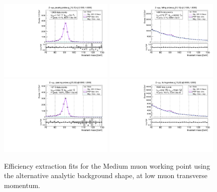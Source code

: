 \begin{figure}
\centering
\includegraphics[width=0.49\textwidth]{figures/Zmm_RecoTemplate_BkgAnalytic_pass_ptBin0_etaBin1.pdf}
\includegraphics[width=0.49\textwidth]{figures/Zmm_RecoTemplate_BkgAnalytic_fail_ptBin0_etaBin1.pdf}
\includegraphics[width=0.49\textwidth]{figures/Zmm_RecoTemplate_BkgAnalytic_pass_ptBin1_etaBin9.pdf}
\includegraphics[width=0.49\textwidth]{figures/Zmm_RecoTemplate_BkgAnalytic_fail_ptBin1_etaBin9.pdf}
\caption{Efficiency extraction fits for the Medium muon working point using the alternative analytic background shape, at low muon transverse momentum.}
\label{fig:ZmmAltBkgFits1}
\end{figure}

